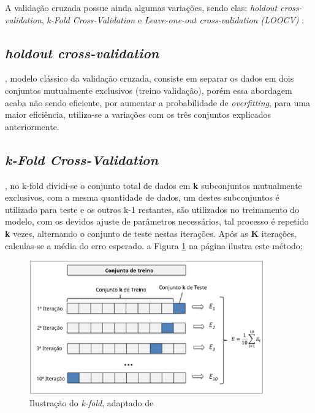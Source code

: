 A validação cruzada possue ainda algumas variações, sendo elas: \textit{holdout cross-validation}, \textit{k-Fold Cross-Validation} e \textit{Leave-one-out cross-validation (LOOCV)} \cite{james2013introduction}:


\subsection{\textit{holdout cross-validation}}, modelo clássico da validação cruzada, consiste em separar os dados em dois conjuntos mutualmente exclusivos (treino validação), porém essa abordagem acaba não sendo eficiente, por aumentar a probabilidade de \textit{overfitting}, para uma maior eficiência, utiliza-se a variações com os três conjuntos explicados anteriormente\cite{raschka2015python}.

\subsection{\textit{k-Fold Cross-Validation}}, no k-fold dividi-se o conjunto total de dados em \textbf{k} subconjuntos mutualmente exclusivos, com a mesma quantidade de dados, um destes subconjuntos é utilizado para teste e os outros k-1 restantes, são utilizados no treinamento do modelo, com os devidos ajuste de parâmetros necessários, tal processo é repetido \textbf{k} vezes, alternando o conjunto de teste nestas iterações. Após as \textbf{K} iterações, calculas-se a média do erro esperado. a Figura \ref{kfold} na página \pageref{kfold} ilustra este método;

\begin{figure}[!htb]
    \centering
     \includegraphics[width=0.9\textwidth]{figuras/kfold.eps}
     \caption{Ilustração do \textit{k-fold}, adaptado de }
     \label{kfold}
\end{figure}

